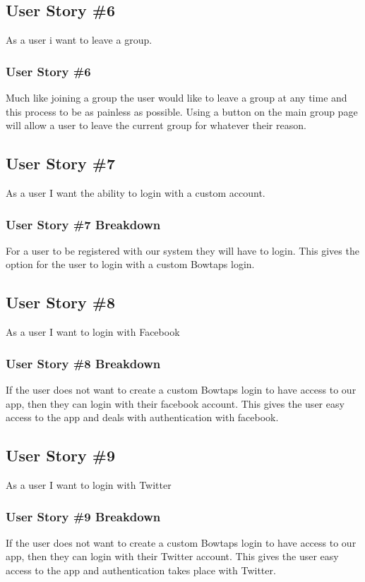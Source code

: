\subsection{User Story \#6} 
As a user i want to leave a group.

\subsubsection{User Story \#6}
Much like joining a group the user would like to leave a group at any time and this process to be as painless as possible.  Using a button on the main group page will allow a user to leave the current group for whatever their reason.

\subsection{User Story \#7} 
As a user I want the ability to login with a custom account.

\subsubsection{User Story \#7 Breakdown}
For a user to be registered with our system they will have to login.  This gives the option for the user to login with a custom Bowtaps login.

\subsection{User Story \#8}
As a user I want to login with Facebook

\subsubsection{User Story \#8 Breakdown}
If the user does not want to create a custom Bowtaps login to have access to our app,  then they can login with their facebook account.  This gives the user easy access to the app and deals with authentication with facebook.

\subsection{User Story \#9}
As a user I want to login with Twitter
\subsubsection{User Story \#9 Breakdown}
If the user does not want to create a custom Bowtaps login to have access to our app, then they can login with their Twitter account.  This gives the user easy access to the app and authentication takes place with Twitter.
